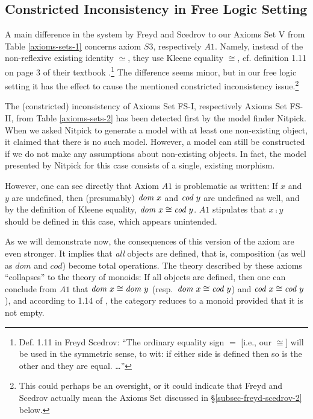  \subsection{Constricted Inconsistency in Free Logic
   Setting} \label{subsec-freyd-scedrov-1} A main difference in the
 system by Freyd and Scedrov to our Axioms Set V from Table
 \ref{axioms-sets-1} concerns axiom $S3$, respectively $A1$. Namely,
 instead of the non-reflexive existing identity $\simeq$, they use
 Kleene equality $\cong$, cf. definition 1.11 on page 3 of their textbook
 \cite{FreydScedrov90}.\footnote{Def. 1.11 in Freyd Scedrov: ``The
   ordinary equality sign $=$ [i.e., our $\cong$] will be used in the
   symmetric sense, to wit: if either side is defined then so is the
   other and they are equal. \ldots''} The difference seems minor, but
 in our free logic setting it has the effect to cause the mentioned
 constricted inconsistency issue.\footnote{This could perhaps be an
   oversight, or it could indicate that Freyd and Scedrov actually
   mean the Axioms Set discussed in \S\ref{subsec-freyd-scedrov-2}
   below.%
 }

  The (constricted) inconsistency of Axioms Set FS-I, respectively
  Axioms Set FS-II, from Table \ref{axioms-sets-2} has been 
  detected first by the model finder Nitpick. When we asked Nitpick to
  generate a model with at least one non-existing object, it claimed
  that there is no such model. However, a model can still be
  constructed if we do not make any assumptions about non-existing
  objects. In fact, the model presented by Nitpick for this case
  consists of a single, existing morphism.

However, one can see directly that Axiom $A1$ is problematic
as written: If $x$ and $y$ are undefined, then
(presumably) $\textit{dom \/} x$ and $\textit{cod \/} y$ are undefined as
well, and by the definition of Kleene equality, $\textit{dom \/} x \cong \textit{cod \/}
  y$. $A1$ stipulates that $x \comp y$ should be defined in
this case, which appears unintended.

As we will demonstrate now, the consequences of this version of the axiom are
even stronger. It implies that \emph{all} objects are defined,
that is, composition (as well as $dom$ and $cod$) become total operations.
The theory described by these axioms ``collapses'' to the theory of
monoids: If all objects are defined, then one can conclude from $A1$ that 
$\textit{dom \/} x \cong \textit{dom \/} y$ (resp.~$\textit{dom \/} x \cong \textit{cod \/} y$) and $\textit{cod \/} x \cong \textit{cod \/} y$), 
and according to 1.14 of \cite{FreydScedrov90}, 
the category reduces to a monoid provided that it is not empty.

